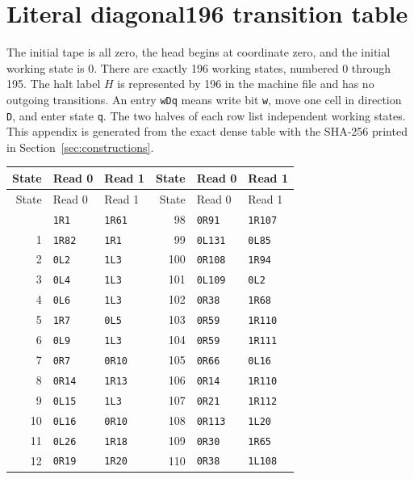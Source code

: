 \clearpage
\appendix
\section{Literal diagonal196 transition table}
The initial tape is all zero, the head begins at coordinate zero, and the
initial working state is 0. There are exactly 196 working states, numbered
0 through 195. The halt label $H$ is represented by 196 in the machine file
and has no outgoing transitions. An entry \texttt{wDq} means write bit
\texttt{w}, move one cell in direction \texttt{D}, and enter state \texttt{q}.
The two halves of each row list independent working states. This appendix
is generated from the exact dense table with the SHA-256 printed in
Section~\ref{sec:constructions}.

\small
\begin{longtable}{rll@{\qquad}rll}
\toprule
State & Read 0 & Read 1 & State & Read 0 & Read 1\\
\midrule
\endfirsthead
\toprule
State & Read 0 & Read 1 & State & Read 0 & Read 1\\
\midrule
\endhead
\bottomrule
\endfoot
0 & \texttt{1R1} & \texttt{1R61} & 98 & \texttt{0R91} & \texttt{1R107}\\
1 & \texttt{1R82} & \texttt{1R1} & 99 & \texttt{0L131} & \texttt{0L85}\\
2 & \texttt{0L2} & \texttt{1L3} & 100 & \texttt{0R108} & \texttt{1R94}\\
3 & \texttt{0L4} & \texttt{1L3} & 101 & \texttt{0L109} & \texttt{0L2}\\
4 & \texttt{0L6} & \texttt{1L3} & 102 & \texttt{0R38} & \texttt{1R68}\\
5 & \texttt{1R7} & \texttt{0L5} & 103 & \texttt{0R59} & \texttt{1R110}\\
6 & \texttt{0L9} & \texttt{1L3} & 104 & \texttt{0R59} & \texttt{1R111}\\
7 & \texttt{0R7} & \texttt{0R10} & 105 & \texttt{0R66} & \texttt{0L16}\\
8 & \texttt{0R14} & \texttt{1R13} & 106 & \texttt{0R14} & \texttt{1R110}\\
9 & \texttt{0L15} & \texttt{1L3} & 107 & \texttt{0R21} & \texttt{1R112}\\
10 & \texttt{0L16} & \texttt{0R10} & 108 & \texttt{0R113} & \texttt{1L20}\\
11 & \texttt{0L26} & \texttt{1R18} & 109 & \texttt{0R30} & \texttt{1R65}\\
12 & \texttt{0R19} & \texttt{1R20} & 110 & \texttt{0R38} & \texttt{1L108}\\

\end{longtable}
